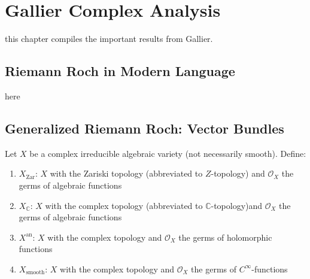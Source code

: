 \documentclass{book}
\newcommand{\C}{{\mathbb{C}}}
\newcommand{\CO}{{\mathcal{O}}}
\newcommand{\an}{{\operatorname{an}}}
\newcommand{\smooth}{{\operatorname{smooth}}}
\newcommand{\Zar}{{\operatorname{Zar}}}
\begin{document}
\chapter{Gallier Complex Analysis}\label{cha:gallier}

this chapter compiles the important results from Gallier.

\section{Riemann Roch in Modern Language}

here

\section{Generalized Riemann Roch: Vector Bundles}

Let $X$ be a complex irreducible algebraic variety (not necessarily smooth). Define:
\begin{enumerate}
	\item $X_\Zar$: $X$ with the Zariski topology (abbreviated to $Z$-topology) and $\CO_X$ the germs of algebraic functions
	\item $X_\C$: $X$ with the complex topology (abbreviated to $\C$-topology)and $\CO_X$ the germs of algebraic functions
	\item $X^\an$: $X$ with the complex topology and $\CO_X$ the germs of holomorphic functions
	\item $X_\smooth$: $X$ with the complex topology and $\CO_X$ the germs of $C^\infty$-functions
\end{enumerate}
\end{document}
